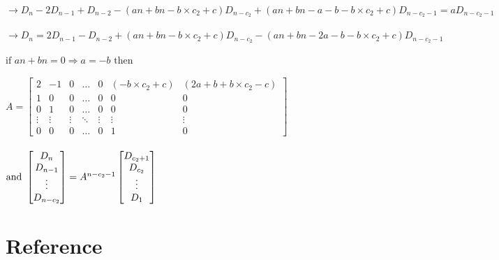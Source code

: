 \begin{enumerate}
    \\
    $\rightarrow D_n - 2D_{n-1} + D_{n-2} - (an+bn-b\times c_2+c)D_{n-c_2} + (an+bn-a-b-b\times c_2+c)D_{n-c_2-1} = aD_{n-c_2-1}$\\
    \\
    $\rightarrow D_n = 2D_{n-1} - D_{n-2} + (an+bn-b\times c_2+c)D_{n-c_2} - (an+bn-2a-b-b\times c_2+c)D_{n-c_2-1}$\\
    \\
    $\text{if } an+bn=0 \Rightarrow a=-b \text{ then }$\\
    \\
    $A=\begin{bmatrix}
    2 & -1 & 0 & \dots & 0 & (-b\times c_2+c) & (2a+b+b\times c_2-c)\\
    1 & 0 & 0 & \dots & 0 & 0 & 0\\
    0 & 1 & 0 & \dots & 0 & 0 & 0\\
    \vdots & \vdots & \vdots & \ddots & \vdots & \vdots & \vdots\\
    0 & 0 & 0 & \dots & 0 & 1 & 0 
    \end{bmatrix}$\\
    \\
    $\text{and }
    \begin{bmatrix}
    D_n \\
    D_{n-1}\\
    \vdots \\
    D_{n-c_2}
    \end{bmatrix}
    =
    A^{n-c_2-1}
    \begin{bmatrix}
    D_{c_2+1} \\
    D_{c_2}\\
    \vdots \\
    D_{1}
    \end{bmatrix}\\$
\end{enumerate}

\section{Reference}